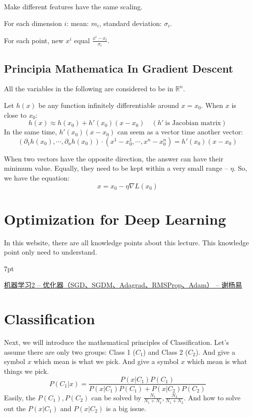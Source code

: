 \documentclass{article}
\newenvironment{quoteblock}{%
\def\FrameCommand{%
\hspace{1pt}%
{\color{DarkBlue}\vrule width 2pt}%
{\color{formalshade}\vrule width 4pt}%
\colorbox{formalshade}%
}%
\MakeFramed{\advance\hsize-\width\FrameRestore}%
\noindent\hspace{-4.55pt}%
\begin{adjustwidth}{}{7pt}%
\vspace{2pt}\vspace{2pt}%
}
{%
\vspace{2pt}\end{adjustwidth}\endMakeFramed%
}
\newenvironment{propblock}[1][\textbf{Proposition}]{\begin{tcolorbox}
[title = \textbf{#1}, colback=Salmon!20, colframe=Salmon!90!Black]}{\end{tcolorbox}}
\newenvironment{colblock}[1][\textbf{Collary}]{\begin{tcolorbox}[colback=JungleGreen!10!Cerulean!15,colframe=CornflowerBlue!60!Black,title = \textbf{#1}]}{\end{tcolorbox}}
\begin{document}
\begin{colblock}[Definition of Feature Scaling]
    Make different features have the same scaling.
\end{colblock}

\begin{propblock}[How To Do Feature Scaling]
    For each dimension $i$: mean: $m_i$, standard deviation: $\sigma_i$.
    
    For each point, new $x^i$ equal $\frac{x^i-x_i}{\sigma_i}$.
\end{propblock}

\subsection{Principia Mathematica In Gradient Descent}

All the variables in the following are considered to be in $\mathbb{R}^n$.

Let $h(x)$ be any function infinitely differentiable around $x = x_0$. When $x$ is close to $x_0$:
$$
h(x)\approx h(x_0)+h'(x_0)(x-x_0) \quad (h'\ \text{is Jacobian matrix})
$$
In the same time, $h'(x_0)(x-x_0)$ can seem as a vector time another vector:
$$
(\partial_1 h(x_0),\cdots,\partial_n h(x_0))\cdot (x^1-x_0^1,\cdots,x^n-x_0^n)=h'(x_0)(x-x_0)
$$

When two vectors have the opposite direction, the answer can have their minimum value. Equally, they need to be kept within a very small range -- $\eta$. So, we have the equation:
$$
x = x_0 - \eta \nabla L(x_0)
$$

\section{Optimization for Deep Learning}

In this website, there are all knowledge points about this lecture. This knowledge point only need to understand.

\begin{quoteblock}
    \href{https://zhuanlan.zhihu.com/p/208178763}{机器学习2 -- 优化器（SGD、SGDM、Adagrad、RMSProp、Adam） -- 谢杨易}
\end{quoteblock}

\section{Classification}

Next, we will introduce the mathematical principles of Classification. Let's assume there are only two groups: Class 1 ($C_1$) and Class 2 ($C_2$). And give a symbol $x$ which mean is what we pick.  And give a symbol $x$ which mean is what things we pick.
$$
P(C_1|x) = \frac{P(x|C_1)P(C_1)}{P(x|C_1)P(C_1)+P(x|C_2)P(C_2)}
$$
Easily, the $P(C_1),P(C_2)$ can be solved by $\frac{N_1}{N_1+N_2},\frac{N_2}{N_1+N_2}$. And how to solve out the $P(x|C_1)$ and $P(x|C_2)$ is a big issue.
\end{document}
